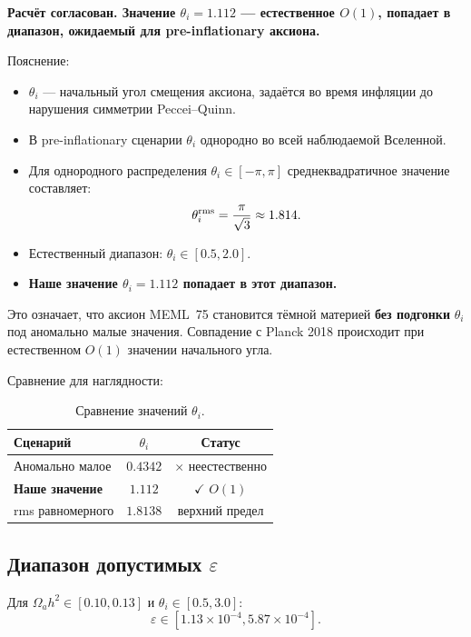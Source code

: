 \documentclass[12pt,a4paper]{article}
\numberwithin{equation}{section}
\begin{document}
\textbf{Расчёт согласован. Значение $\theta_i = 1.112$ --- 
естественное $O(1)$, попадает в диапазон, ожидаемый для 
pre-inflationary аксиона.}

Пояснение:
\begin{itemize}[leftmargin=1.5em,itemsep=0.05em]
\item $\theta_i$ --- начальный угол смещения аксиона, 
задаётся во время инфляции до нарушения симметрии 
Peccei--Quinn.
\item В pre-inflationary сценарии $\theta_i$ однородно 
во всей наблюдаемой Вселенной.
\item Для однородного распределения $\theta_i \in [-\pi, \pi]$ 
среднеквадратичное значение составляет:
\begin{equation}
\theta_i^{\rm rms} = \frac{\pi}{\sqrt{3}} \approx 1.814.
\end{equation}
\item Естественный диапазон: $\theta_i \in [0.5, 2.0]$.
\item \textbf{Наше значение $\theta_i = 1.112$ попадает 
в этот диапазон.}
\end{itemize}

Это означает, что аксион MEML~75 становится тёмной материей 
\textbf{без подгонки} $\theta_i$ под аномально малые значения. 
Совпадение с Planck 2018 происходит при естественном $O(1)$ 
значении начального угла.

Сравнение для наглядности:
\begin{table}[H]
\centering
\caption{Сравнение значений $\theta_i$.}
\begin{tabular}{lcc}
\toprule
Сценарий & $\theta_i$ & Статус \\
\midrule
Аномально малое & $0.4342$ & $\times$ неестественно \\
\textbf{Наше значение} & $\mathbf{1.112}$ & $\checkmark$ $O(1)$ \\
rms равномерного & $1.8138$ & верхний предел \\
\bottomrule
\end{tabular}
\end{table}

\subsection{Диапазон допустимых $\varepsilon$}

Для $\Omega_a h^2 \in [0.10, 0.13]$ и $\theta_i \in [0.5, 3.0]$:
\begin{equation}
\varepsilon \in [1.13\times 10^{-4}, 5.87\times 10^{-4}].
\end{equation}
\end{document}

